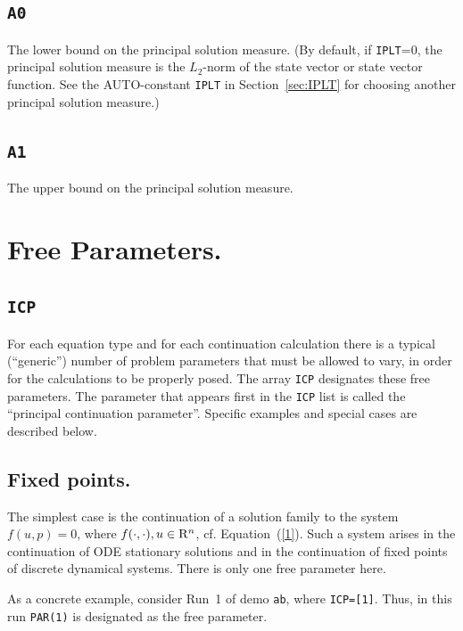 \documentclass[12pt]{report}
\def\Rn{{\rm R}^n}
\begin{document}
\subsection{\tt A0}  \label{sec:A0}
 The lower bound on the principal solution measure.
 (By default, if {\tt IPLT}=0, the principal solution measure
 is the $L_2$-norm of the state vector or state vector function.
 See the {\cal AUTO}-constant {\tt IPLT} in Section~\ref{sec:IPLT} 
 for choosing another principal solution measure.)

\subsection{\tt A1}  \label{sec:A1}
 The upper bound on the principal solution measure.

\section{ Free Parameters.} \label{sec:Free_parameters}


\subsection{\tt ICP}  \label{sec:ICP}
For each equation type and for each continuation calculation there is
a typical (``generic'') number of problem parameters that must be 
allowed to vary, in order for the calculations to be properly posed.
The array {\tt ICP} designates these free parameters.
The parameter that appears first in the {\tt ICP} list is called the 
``principal continuation parameter''.
Specific examples and special cases are described below.

\subsection{ Fixed points.}
The simplest case is the continuation of a solution family to the system
$ f( u , p ) = 0$,  where $f(\cdot,\cdot), u \in \Rn$, cf. Equation~(\ref{1}).
Such a system arises in the continuation of ODE stationary solutions and 
in the continuation of fixed points of discrete dynamical systems.
There is only one free parameter here.

As a concrete example, consider Run~1 of demo {\tt ab},
where {\tt ICP=[1]}. 
Thus, in this run {\tt PAR(1)} is designated as the free parameter.
\end{document}
